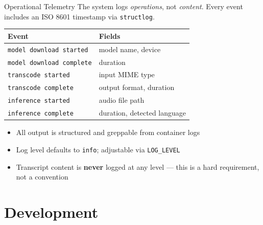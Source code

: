 \documentclass{beamer}
\begin{document}
\begin{frame}{Operational Telemetry}
    The system logs \textit{operations}, not \textit{content}.
    Every event includes an ISO 8601 timestamp via \texttt{structlog}.

    \vspace{0.4em}
    \begin{table}
    \centering
    \scriptsize
    \begin{tabular}{ll}
        \toprule
        \textbf{Event} & \textbf{Fields} \\
        \midrule
        \texttt{model download started}  & model name, device \\
        \texttt{model download complete} & duration \\
        \texttt{transcode started}       & input MIME type \\
        \texttt{transcode complete}      & output format, duration \\
        \texttt{inference started}       & audio file path \\
        \texttt{inference complete}      & duration, detected language \\
        \bottomrule
    \end{tabular}
    \end{table}

    \vspace{0.4em}
    \begin{itemize}
        \item All output is structured and greppable from container logs
        \item Log level defaults to \texttt{info}; adjustable via \texttt{LOG\_LEVEL}
        \item Transcript content is \textbf{never} logged at any level ---
              this is a hard requirement, not a convention
    \end{itemize}
\end{frame}


\section{Development}
\end{document}
